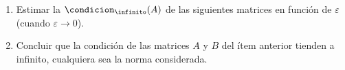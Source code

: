 \begin{enunciado}{\ejercicio}
  \begin{enumerate}[label=(\alph*)]
    \item Estimar la $\condicion_\infinito(A)$ de las siguientes matrices en función de $\varepsilon$ (cuando $\varepsilon \to 0$).
          \begin{enumerate}[label=(\roman*)]
          \end{enumerate}

    \item Concluir que la condición de las matrices $A$ y $B$ del ítem anterior tienden a infinito, cualquiera
          sea la norma considerada.
  \end{enumerate}
\end{enunciado}

